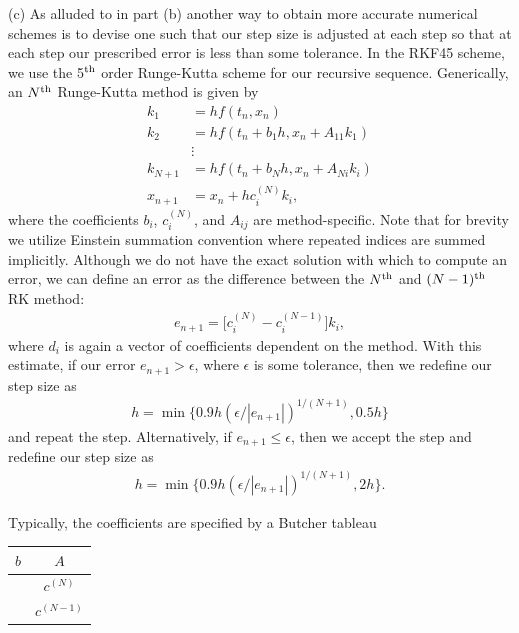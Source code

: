 {(c) As alluded to in part (b) another way to obtain more accurate numerical schemes is to devise one such that our step size is adjusted at each step so that at each step our prescribed error is less than some tolerance.
In the RKF45 scheme, we use the 5$^{\rm th}$ order Runge-Kutta scheme for our recursive sequence.
Generically, an $N^{\rm th}$ Runge-Kutta method is given by
\begin{align}
    k_1 &= h f(t_{n},x_{n}) \\
    k_2 &= h f(t_{n} + b_{1} h, x_{n} + A_{11} k_1) \\
    &\vdots \\
    k_{N+1} &= h f(t_{n} + b_{N} h, x_{n} + A_{Ni} k_{i}) \\
    x_{n+1} &= x_{n} + h c_{i}^{(N)} k_{i}
,\end{align}
where the coefficients $b_{i}$, $c_{i}^{(N)}$, and $A_{ij}$ are method-specific.
Note that for brevity we utilize Einstein summation convention where repeated indices are summed implicitly.
Although we do not have the exact solution with which to compute an error, we can define an error as the difference between the $N^{\rm th}$ and $(N - 1)^{\rm th}$ RK method:
\begin{align}
    e_{n+1} = \Big[ c_{i}^{(N)} - c_{i}^{(N-1)} \Big] k_{i}
,\end{align}
where $d_{i}$ is again a vector of coefficients dependent on the method.
With this estimate, if our error $e_{n+1} > \epsilon$, where $\epsilon$ is some tolerance, then we redefine our step size as
\begin{align}
    h = \min\{ 0.9 h (\epsilon/|e_{n+1}|)^{1/(N+1)}, 0.5 h \}
\end{align}
and repeat the step.
Alternatively, if $e_{n+1} \leq \epsilon$, then we accept the step and redefine our step size as
\begin{align}
    h = \min\{ 0.9 h (\epsilon/|e_{n+1}|)^{1/(N+1)},2h \}
.\end{align}

Typically, the coefficients are specified by a Butcher tableau
\begin{table}[h!]
    \centering
    \begin{tabular}{c|c}
        $b$ & $A$ \\
        \hline
         & $c^{(N)}$ \\
         & $c^{(N-1)}$
    \end{tabular}
\end{table}

}
